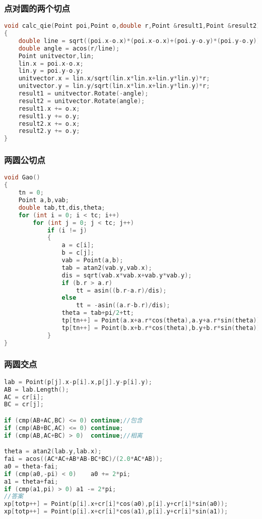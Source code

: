 	\subsubsection{点对圆的两个切点}
	\begin{lstlisting}[language=c++]
void calc_qie(Point poi,Point o,double r,Point &result1,Point &result2)
{
	double line = sqrt((poi.x-o.x)*(poi.x-o.x)+(poi.y-o.y)*(poi.y-o.y));
	double angle = acos(r/line);
	Point unitvector,lin;
	lin.x = poi.x-o.x;
	lin.y = poi.y-o.y;
	unitvector.x = lin.x/sqrt(lin.x*lin.x+lin.y*lin.y)*r;
	unitvector.y = lin.y/sqrt(lin.x*lin.x+lin.y*lin.y)*r;
	result1 = unitvector.Rotate(-angle);
	result2 = unitvector.Rotate(angle);
	result1.x += o.x;
	result1.y += o.y;
	result2.x += o.x;
	result2.y += o.y;
}
	\end{lstlisting}
	
	\subsubsection{两圆公切点}
	\begin{lstlisting}[language=c++]
void Gao()
{
	tn = 0;
	Point a,b,vab;
	double tab,tt,dis,theta;
	for (int i = 0; i < tc; i++)
		for (int j = 0; j < tc; j++)
			if (i != j)
			{
				a = c[i];
				b = c[j];
				vab = Point(a,b);
				tab = atan2(vab.y,vab.x);
				dis = sqrt(vab.x*vab.x+vab.y*vab.y);
				if (b.r > a.r)
					tt = asin((b.r-a.r)/dis);
				else
					tt = -asin((a.r-b.r)/dis);
				theta = tab+pi/2+tt;
				tp[tn++] = Point(a.x+a.r*cos(theta),a.y+a.r*sin(theta));
				tp[tn++] = Point(b.x+b.r*cos(theta),b.y+b.r*sin(theta));
			}
}
	\end{lstlisting}
	
	\subsubsection{两圆交点}
	\begin{lstlisting}[language=c++]
lab = Point(p[j].x-p[i].x,p[j].y-p[i].y);
AB = lab.Length();
AC = cr[i];
BC = cr[j];

if (cmp(AB+AC,BC) <= 0)	continue;//包含
if (cmp(AB+BC,AC) <= 0)	continue;
if (cmp(AB,AC+BC) > 0)	continue;//相离

theta = atan2(lab.y,lab.x);
fai = acos((AC*AC+AB*AB-BC*BC)/(2.0*AC*AB));
a0 = theta-fai;
if (cmp(a0,-pi) < 0)	a0 += 2*pi;
a1 = theta+fai;
if (cmp(a1,pi) > 0)	a1 -= 2*pi;
//答案
xp[totp++] = Point(p[i].x+cr[i]*cos(a0),p[i].y+cr[i]*sin(a0));
xp[totp++] = Point(p[i].x+cr[i]*cos(a1),p[i].y+cr[i]*sin(a1));
	\end{lstlisting}